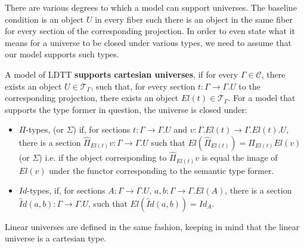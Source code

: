 \begin{comment}
For compatible $M$ and $L$, there is a natural map
\[
  f : \mathcal{L}_\Gamma(LA \otimes \Xi, B) \to \mathcal{L}_{\Gamma.A}(\pi^*_A\Xi, \pi^*_AB)
\]
In order to illustrate this, first . The canonical morphism
\[
  \beta \circ ! : \pi^{*(\mathcal{T})}_AA \to 1 \to M_{\Gamma.A}(I)
\]
in $\mathcal{T}_{\Gamma.A}$ gives rise to a map $L_{\Gamma.A}\pi^{*(\mathcal{T})}_AA \to I$, which we can transform into the map $\hat f : \pi^{*(\mathcal{L})}_AL_\Gamma A \to I$. Then, we can for any map
\end{comment}


There are various degrees to which a model can support universes. The baseline condition is an object $U$ in every fiber such there is an object in the same fiber for every section of the corresponding projection. In order to even state what it means for a universe to be closed under various types, we need to assume that our model supports such types.
\begin{defn}A model of LDTT \textbf{supports cartesian universes}, if for every $\Gamma \in \mathcal{C}$, there exists an object $U \in \mathcal{T}_{\Gamma}$, such that, for every section $t : \Gamma \to \Gamma.U$ to the corresponding projection, there exists an object $El(t) \in \mathcal{T}_{\Gamma}$. For a model that supports the type former in question, the universe is closed under:
  \begin{itemize}
  \item $\Pi$-types, (or $\Sigma$) if, for sections $t : \Gamma \to \Gamma.U$ and $v : \Gamma.El(t) \to \Gamma.El(t).U$, there is a section $\hat \Pi_{El(t)}v : \Gamma \to \Gamma.U$ such that $El(\hat \Pi_{El(t)}) = \Pi_{El(t)}El(v)$ (or $\Sigma$) i.e. if the object corresponding to $\hat \Pi_{El(t)}v$ is equal the image of $El(v)$ under the functor corresponding to the semantic type former.
  \item $Id$-types, if, for sections $A : \Gamma \to \Gamma.U$, $a, b : \Gamma \to \Gamma.El(A)$, there is a section $\hat Id(a, b) : \Gamma \to \Gamma.U$, such that $El(\hat Id(a, b)) = Id_A$.
  \end{itemize}
\end{defn}
Linear universes are defined in the same fashion, keeping in mind that the linear universe is a cartesian type.
